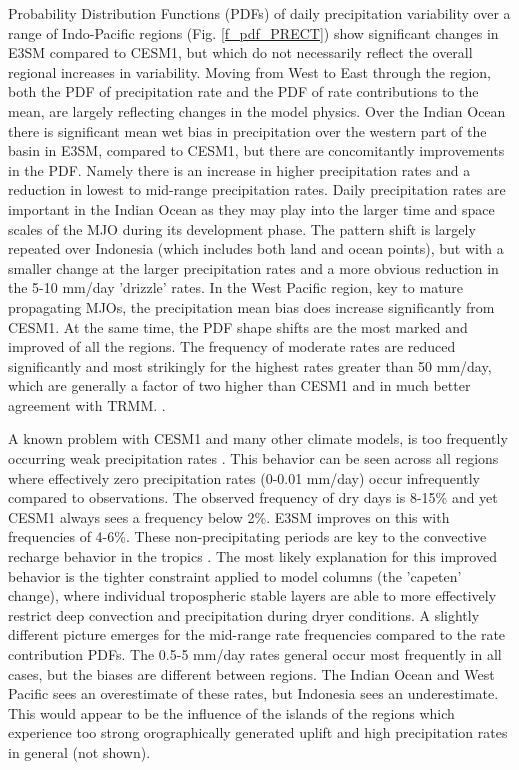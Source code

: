 \documentclass[draft,ms]{AGUTeX}
\begin{document}
\begin{article}
Probability Distribution Functions (PDFs) of daily precipitation variability over a range of Indo-Pacific regions (Fig. \ref{f_pdf_PRECT}) show significant changes in E3SM compared to CESM1, but which do not necessarily reflect the overall regional increases in variability. Moving from West to East through the region, both the PDF of precipitation rate and the PDF of rate contributions to the mean, are largely reflecting changes in the model physics. Over the Indian Ocean there is significant mean wet bias in precipitation over the western part of the basin in E3SM, compared to CESM1, but there are concomitantly improvements in the PDF. Namely there is an increase in higher precipitation rates and a reduction in lowest to mid-range precipitation rates. Daily precipitation rates are important in the Indian Ocean as they may play into the larger time and space scales of the MJO during its development phase. The pattern shift is largely repeated over Indonesia (which includes both land and ocean points), but with a smaller change at the larger precipitation rates and a more obvious reduction in the 5-10 mm/day 'drizzle' rates. In the West Pacific region, key to mature propagating MJOs, the precipitation mean bias does increase significantly from CESM1. At the same time, the PDF shape shifts are the most marked and improved of all the regions. The frequency of moderate rates are reduced significantly and most strikingly for the highest rates greater than 50 mm/day, which are generally a factor of two higher than CESM1 and in much better agreement with TRMM. .

A known problem with CESM1 and many other climate models, is too frequently occurring weak precipitation rates \citep{Stephens2010}. This behavior can be seen across all regions where effectively zero precipitation rates (0-0.01 mm/day) occur infrequently compared to observations. The observed frequency of dry days is 8-15\% and yet CESM1 always sees a frequency below 2\%. E3SM improves on this with frequencies of 4-6\%. These non-precipitating periods are key to the convective recharge behavior in the tropics \citep{Xu2014}. The most likely explanation for this improved behavior is the tighter constraint applied to model columns (the 'capeten' change), where individual tropospheric stable layers are able to more effectively restrict deep convection and precipitation during dryer conditions. A slightly different picture emerges for the mid-range rate frequencies compared to the rate contribution PDFs. The 0.5-5 mm/day rates general occur most frequently in all cases, but the biases are different between regions. The Indian Ocean and West Pacific sees an overestimate of these rates, but Indonesia sees an underestimate. This would appear to be the influence of the islands of the regions which experience too strong orographically generated uplift and high precipitation rates in general (not shown).  




\end{article}
\end{document}
